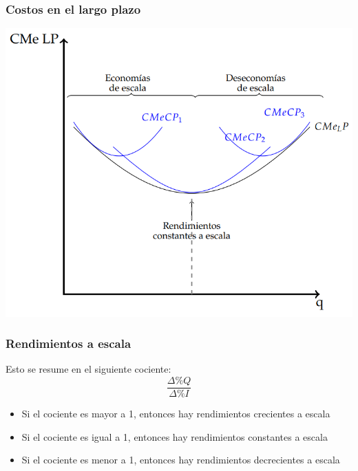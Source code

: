 \documentclass{beamer}
\begin{document}
\begin{frame}
    \frametitle{Costos en el largo plazo}
    \centering
    \includegraphics[scale=0.6]{../Figures/C13.10.png}
\end{frame}

\begin{frame}
    \frametitle{Rendimientos a escala}
    Esto se resume en el siguiente cociente:
    \[ \frac{\Delta \% Q}{\Delta \% I} \]
    \begin{itemize}
        \item Si el cociente es mayor a 1, entonces hay rendimientos crecientes a escala
        \item Si el cociente es igual a 1, entonces hay rendimientos constantes a escala
        \item Si el cociente es menor a 1, entonces hay rendimientos decrecientes a escala
    \end{itemize}
\end{frame}
\end{document}
